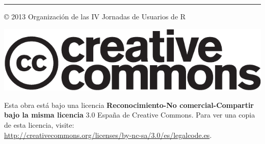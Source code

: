 




\vspace*{\fill}




\rule[.5ex]{\linewidth}{1pt} 
© 2013 Organización de las IV Jornadas de Usuarios de R

\begin{center}
\includegraphics[scale=0.5]{Logos/cc-logo}
\par\end{center}

Esta obra está bajo una licencia \textbf{Reconocimiento-No comercial-Compartir
bajo la misma licencia} 3.0 España de Creative Commons. Para ver una
copia de esta licencia, visite:\\
 \url{http://creativecommons.org/licenses/by-nc-sa/3.0/es/legalcode.es}.

